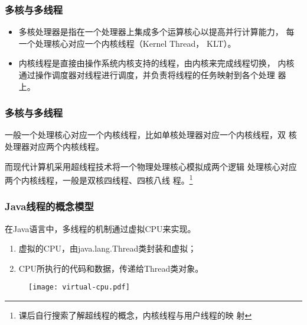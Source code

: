 \begin{frame}[fragile]
  \frametitle{多核与多线程}
  \begin{itemize}
  \item 多核处理器是指在一个处理器上集成多个运算核心以提高并行计算能力，
    每一个处理核心对应一个内核线程（Kernel Thread， KLT）。
  \item 内核线程是直接由操作系统内核支持的线程，由内核来完成线程切换，
    内核通过操作调度器对线程进行调度，并负责将线程的任务映射到各个处理
    器上。
  \end{itemize}

\end{frame}

\begin{frame}[fragile]
  \frametitle{多核与多线程}
  一般一个处理核心对应一个内核线程，比如单核处理器对应一个内核线程，双
  核处理器对应两个内核线程。

  {\Red\kai 而现代计算机采用超线程技术将一个物理处理核心模拟成两个逻辑
    处理核心对应两个内核线程，一般是双核四线程、四核八线
    程。\footnote{课后自行搜索了解超线程的概念，内核线程与用户线程的映
      射}}

  \begin{figure}
\centering
{}
\end{figure}
\end{frame}

\begin{frame}[fragile] %
\frametitle{Java线程的概念模型}

在Java语言中，多线程的机制通过{\hei 虚拟CPU}来实现。

\begin{enumerate}\kai
\item 虚拟的CPU，由java.lang.Thread类封装和虚拟；
\item CPU所执行的代码和数据，传递给Thread类对象。
\end{enumerate}
\begin{figure}
\centering
\texttt{[image: virtual-cpu.pdf]}
\end{figure}
\end{frame}


